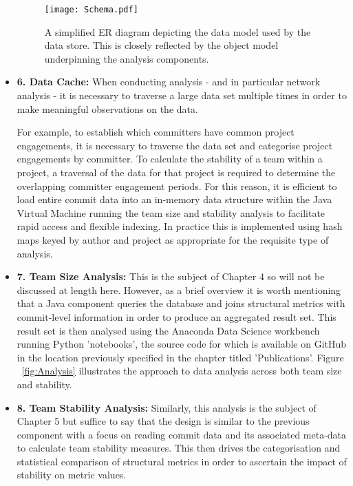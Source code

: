 \begin{itemize}
 \begin{figure}[htbp!] 
 \centering    
 \texttt{[image: Schema.pdf]}
 \caption[A simplified ER diagram depicting the logical data model used by the data store.]{A simplified ER diagram depicting the data model used by the data store. This is closely reflected by the object model underpinning the analysis components.}
 \label{fig:Schema}
 \end{figure}

\item \textbf{6. Data Cache:}
When conducting analysis - and in particular network analysis - it is necessary to traverse a large data set multiple times in order to make meaningful observations on the data.

For example, to establish which committers have common project engagements, it is necessary to traverse the data set and categorise project engagements by committer. To calculate the stability of a team within a project, a traversal of the data for that project is required to determine the overlapping committer engagement periods. For this reason, it is efficient to load entire commit data into an in-memory data structure within the Java Virtual Machine running the team size and stability analysis to facilitate rapid access and flexible indexing. In practice this is implemented using hash maps keyed by author and project as appropriate for the requisite type of analysis. 

\item \textbf{7. Team Size Analysis:} This is the subject of Chapter 4 so will not be discussed at length here. However, as a brief overview it is worth mentioning that a Java component queries the database and joins structural metrics with commit-level information in order to produce an aggregated result set. This result set is then analysed using the Anaconda Data Science workbench \citep{anaconda} running Python 'notebooks', the source code for which is available on GitHub in the location previously specified in the chapter titled 'Publications'. Figure ~\ref{fig:Analysis} illustrates the approach to data analysis across both team size and stability.

\item \textbf{8. Team Stability Analysis:} Similarly, this analysis is the subject of Chapter 5 but suffice to say that the design is similar to the previous component with a focus on reading commit data and its associated meta-data to calculate team stability measures. This then drives the categorisation and statistical comparison of structural metrics in order to ascertain the impact of stability on metric values.
\end{itemize}

